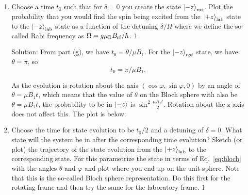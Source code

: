 \documentclass{../lab}
\begin{document}
\begin{enumerate}
\begin{enumerate}
We will obtain an arbitrary qubit state by picking an axis of rotation with $\varphi$, and then rotating about that axis for some time $T$ until we have reached the desired state. Now, if we want $\phi$ (the phase in the state) to take on some particular value, like $\pi/3$, we pick a $\varphi$ that is orthogonal to the line with that angle in the $xy$ plane. For example, the axis given by $\varphi = \pi / 3 + \pi / 2 = 5 \pi / 6$ is orthogonal to the axis given by $\phi / 3$. Then we achieve the desired state by rotating about this axis by an angle $\theta$. A rotation by an angle $\theta$ on the Bloch sphere is given by evolving with our Hamiltonian by a time $t_0$ given by $ t_0  = \theta / \mu B_1$.
\\
\\
You can convince yourself that this is the correct form of $t_0$ from physical intuition. If we crank up the interaction strength of the state with the magnetic field, either by increasing $\mu$ or increasing $B_1$, then the state will rotate faster, and thus $t_0$ will decrease. If we increase $\theta$, we naturally expect $t_0$  to increase. Finally, by dimensional analysis, we see that $\theta / \mu B_1$ has units of 1/frequency = time.



    \item 
        Choose a time $t_{0}$ such that for $\delta=0$ you create the state $\ket{-z}_{\rm rot}$. Plot the probability that you would find the spin being excited from the $\ket{+z}_{\rm lab}$ state to the $\ket{-z}_{\rm lab}$ state as a function of the detuning $\delta/\Omega$ where we define the so-called Rabi frequency as $\Omega=g \mu_{\rm B}B_{\rm rf}/\hbar$.
{1}

Solution: From part (g), we have $t_0 = \theta / \mu B_1$. For the $\ket{-z}_{rot}$ state, we have $\theta = \pi$, so $$t_0 = \pi / \mu B_1.$$

As the evolution is rotation about the axis $(\cos\varphi,\sin\varphi,0)$ by an angle of $\theta=\mu B_1 t$, which means that the value of $\theta$ on the Bloch sphere with also be $\theta=\mu B_1 t$, the probability to be in $\ket{-z}$ is $\sin^2\frac{\mu B_1 t}{2}$. Rotation about the z axis does not affect this. The plot is below:



\item Choose the time for state evolution to be $t_0/2$ and a detuning of $\delta =0$. What state will the system be in after the corresponding time evolution?
		        Sketch (or plot) the trajectory of the state evolution from the $\ket{+z}_{\rm lab}$ to
		        the corresponding state. For this parametrize the state in terms of Eq.~\ref{eq:bloch} with the angles $\theta$ and $\varphi$ and plot where you end up on the unit-sphere. Note that this is the so-called Bloch sphere representation. 
			Do this first for the rotating frame and then try the same for the laboratory frame. 
			{1}


\end{enumerate}
\end{enumerate}
\end{document}

